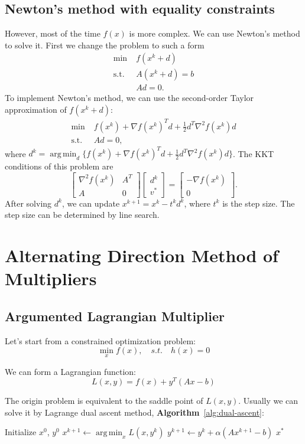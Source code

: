 \documentclass[lang=en,color=blue,mode=fancy,titlestyle=hang]{elegantbook}
\DeclareMathOperator*{\argmin}{arg\,min}
\newcommand{\algoref}[1]{\textbf{Algorithm}~\ref{#1}}
\begin{document}
\subsection{Newton's method with equality constraints}
However, most of the time $f(x)$ is more complex. We can use Newton's method to solve it.
First we change the problem to such a form
\begin{align*}
\min \; &f(x^k + d)\\
\text{s.t.} \; &A(x^k + d) = b\\
&Ad = 0.
\end{align*}
To implement Newton's method, we can use the second-order Taylor approximation of $f(x^k + d)$:
\begin{align*}
\min \; &f(x^k) + \nabla f(x^k)^T d + \frac12 d^T \nabla^2 f(x^k) d\\
\text{s.t.} \; &Ad = 0,
\end{align*}
where $d^k = \argmin_d \{f(x^k) + \nabla f(x^k)^T d + \frac12 d^T \nabla^2 f(x^k) d\}$.
The KKT conditions of this problem are
\[
\begin{bmatrix}
  \nabla^2 f(x^k) & A^T \\
  A & 0
\end{bmatrix}
\begin{bmatrix}
  d^k \\ v^*
\end{bmatrix} =
\begin{bmatrix}
  -\nabla f(x^k) \\ 0
\end{bmatrix}.
\]
After solving $d^k$, we can update $x^{k+1} = x^k - t^k d^k$, where $t^k$ is the step size.
The step size can be determined by line search.

\section{Alternating Direction Method of Multipliers}
\subsection{Argumented Lagrangian Multiplier}

Let's start from a constrained optimization problem:
\[
  \min_x f(x), \quad s.t. \quad h(x) = 0
\]

We can form a Lagrangian function:
\[
  L(x, y) = f(x) + y^T (Ax - b)
\]

The origin problem is equivalent to the saddle point of $L(x, y)$. Usually we can
solve it by Lagrange dual ascent method, \algoref{alg:dual-ascent}:
\begin{algorithm}[H]
\caption{Lagrange Dual Ascent Method}
\label{alg:dual-ascent}
\begin{algorithmic}
\State Initialize $x^0$, $y^0$
  \State $x^{k+1} \gets \argmin_x L(x, y^k)$
  \State $y^{k+1} \gets y^k + \alpha (A x^{k+1} - b)$
\EndWhile
\State \Return $x^*$
\end{algorithmic}
\end{algorithm}
\end{document}
